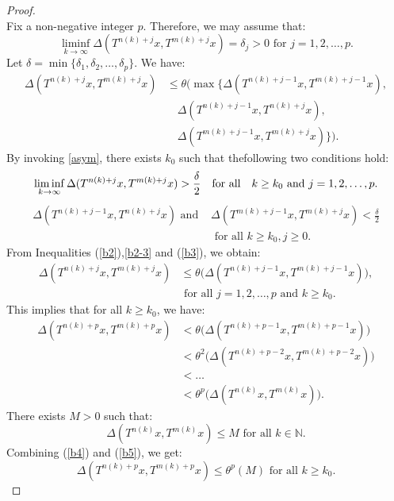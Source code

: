 \documentclass[pdflatex,sn-mathphys-num]{sn-jnl}%
\theoremstyle{thmstyleone}%
\theoremstyle{thmstyletwo}%
\theoremstyle{thmstylethree}%
\begin{document}
\begin{proof}
\[\]
Fix a non-negative integer \(p\). Therefore, we may assume that:
\[
\liminf_{k\to \infty}\Delta(T^{n(k)+j}x, T^{m(k)+j}x)=\delta_{j}>0 \text{ for } j=1,2,\dots,p.
\]
Let \(\delta=\min\{\delta_1,\delta_{2},\dots,\delta_{p}\}\). We have:
\begin{align}\label{b2}
\Delta(T^{n(k)+j}x,T^{m(k)+j}x)&\le \theta\big(\max\big\{\Delta(T^{n(k)+j-1}x,T^{m(k)+j-1}x),\nonumber\\
&\quad \Delta(T^{n(k)+j-1}x,T^{n(k)+j}x), \nonumber\\
&\quad \Delta(T^{m(k)+j-1}x,T^{m(k)+j}x)\big\}\big).
\end{align}
By invoking \eqref{asym}, there exists \(k_0\) such that thefollowing two conditions hold:
\begin{align}\label{b2-3}
\liminf_{k\to \infty}\Delta(T^{n(k)+j}x, T^{m(k)+j}x)>\frac{\delta}{2}\quad\text{for all\quad}k \geq k_0\text{ and } j=1,2,\dots,p.
\end{align}
\begin{align}\label{b3}
\Delta(T^{n(k)+j-1}x,T^{n(k)+j}x) \text { and }& \Delta(T^{m(k)+j-1}x,T^{m(k)+j}x) < \frac{\delta}{2}\nonumber \\
& \text{ for all }k\ge k_0, j\geq 0.
\end{align}
From Inequalities (\ref{b2}),\eqref{b2-3} and (\ref{b3}), we obtain:
\begin{align}
\Delta(T^{n(k)+j}x,T^{m(k)+j}x)&\le \theta\big(\Delta(T^{n(k)+j-1}x,T^{m(k)+j-1}x)\big),\nonumber\\
 &\text{ for all }j=1,2,\dots,p \text{ and } k\ge k_0.
\end{align}
This implies that for all \(k\ge k_0\), we have:
\begin{align}\label{b4}
\Delta(T^{n(k)+p}x,T^{m(k)+p}x)&<\theta\big(\Delta(T^{n(k)+p-1}x,T^{m(k)+p-1}x)\big)\nonumber\\
&<\theta^{2}\big(\Delta(T^{n(k)+p-2}x,T^{m(k)+p-2}x)\big)\nonumber\\
&<\dots\nonumber\\
&<\theta^{p}\big(\Delta(T^{n(k)}x,T^{m(k)}x)\big).
\end{align}
There exists $M>0$ such that:
\begin{equation}\label{b5}
\Delta(T^{n(k)}x,T^{m(k)}x)\leq M \text{ for all } k\in \mathbb{N}.
\end{equation}
Combining (\ref{b4}) and (\ref{b5}), we get:
\begin{equation}
\Delta(T^{n(k)+p}x,T^{m(k)+p}x)\leq \theta^{p}(M) \text{ for all }k\ge k_0.
\end{equation}

\end{proof}
\end{document}
